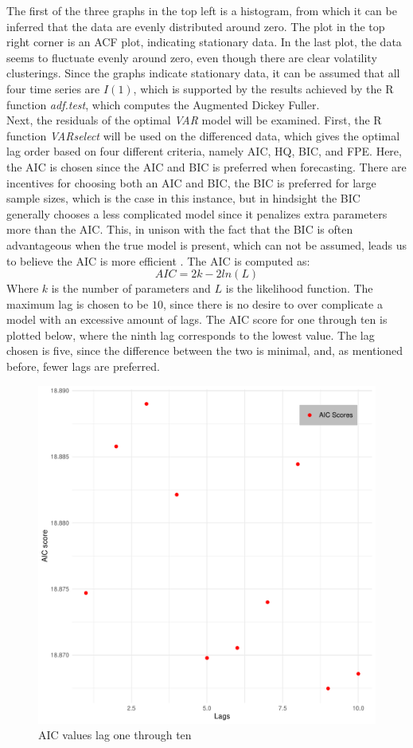 \noindent The first of the three graphs in the top left is a histogram, from which it can be inferred that the data are evenly distributed around zero. The plot in the top right corner is an ACF plot, indicating stationary data. In the last plot, the data seems to fluctuate evenly around zero, even though there are clear volatility clusterings. 
Since the graphs indicate stationary data, it can be assumed that all four time series are $I(1)$, which is supported by the results achieved by the R function \textit{adf.test}, which computes the Augmented Dickey Fuller.\\

\noindent Next, the residuals of the optimal \textit{VAR} model will be examined. First, the R function \textit{VARselect} will be used on the differenced data, which gives the optimal lag order based on four different criteria, namely AIC, HQ, BIC, and FPE. 
Here, the AIC is chosen since the AIC and BIC is preferred when forecasting. There are incentives for choosing both an AIC and BIC, the BIC is preferred for large sample sizes, which is the case in this instance, but in hindsight the BIC generally chooses a less complicated model since it penalizes extra parameters more than the AIC. This, in unison with the fact that the BIC is often advantageous when the true model is present, which can not be assumed, leads us to believe the AIC is more efficient \cite{AICorBIC}. The AIC is computed as:
\begin{equation*}
    AIC=2k-2ln(L)
\end{equation*}
Where $k$ is the number of parameters and $L$ is the likelihood function. The maximum lag is chosen to be $10$, since there is no desire to over complicate a model with an excessive amount of lags. The AIC score for one through ten is plotted below, where the ninth lag corresponds to the lowest value. The lag chosen is five, since the difference between the two is minimal, and, as mentioned before, fewer lags are preferred.
\begin{figure}[H]
    \centering
    \includegraphics[width=0.5\linewidth]{1.Projekt_kode/Billeder/Crypto_lags.pdf}
    \caption{AIC values lag one through ten}
    \label{fig:enter-label}
\end{figure}
